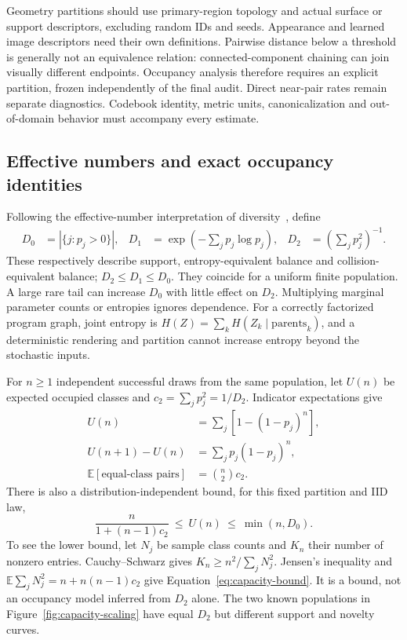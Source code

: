 \documentclass{article}
\begin{document}
Geometry partitions should use primary-region topology and actual surface or
support descriptors, excluding random IDs and seeds. Appearance and learned
image descriptors need their own definitions. Pairwise distance below a threshold
is generally not an equivalence relation: connected-component chaining can join
visually different endpoints. Occupancy analysis therefore requires an explicit
partition, frozen independently of the final audit. Direct near-pair rates remain
separate diagnostics. Codebook identity, metric units, canonicalization and
out-of-domain behavior must accompany every estimate.

\subsection{Effective numbers and exact occupancy identities}
Following the effective-number interpretation of diversity~\cite{hill1973}, define
\begin{align}
 D_0 &= |\{j:p_j>0\}|, &
 D_1 &= \exp\!\left(-\sum_jp_j\log p_j\right), &
 D_2 &= \left(\sum_jp_j^2\right)^{-1}.
 \label{eq:capacity-hill}
\end{align}
These respectively describe support, entropy-equivalent balance and
collision-equivalent balance; $D_2\leq D_1\leq D_0$. They coincide for a uniform
finite population. A large rare tail can increase $D_0$ with little effect on
$D_2$. Multiplying marginal parameter counts or entropies ignores dependence.
For a correctly factorized program graph, joint entropy is
$H(Z)=\sum_k H(Z_k\mid\mathrm{parents}_k)$, and a deterministic rendering and
partition cannot increase entropy beyond the stochastic inputs.

For $n\geq1$ independent successful draws from the same population, let $U(n)$ be
expected occupied classes and $c_2=\sum_jp_j^2=1/D_2$. Indicator expectations give
\begin{align}
 U(n) &= \sum_j\left[1-(1-p_j)^n\right], \label{eq:capacity-occupancy}\\
 U(n+1)-U(n) &= \sum_j p_j(1-p_j)^n, \label{eq:capacity-novelty}\\
 \mathbb E[\text{equal-class pairs}] &= {n\choose2}c_2. \label{eq:capacity-pairs}
\end{align}
There is also a distribution-independent bound, for this fixed partition and IID law,
\begin{equation}
 \frac{n}{1+(n-1)c_2}\ \leq\ U(n)\ \leq\ \min(n,D_0).
 \label{eq:capacity-bound}
\end{equation}
To see the lower bound, let $N_j$ be sample class counts and $K_n$ their number of
nonzero entries. Cauchy--Schwarz gives $K_n\geq n^2/\sum_jN_j^2$. Jensen's
inequality and $\mathbb E\sum_jN_j^2=n+n(n-1)c_2$ give
Equation~\ref{eq:capacity-bound}. It is a bound, not an occupancy model inferred
from $D_2$ alone. The two known populations in Figure~\ref{fig:capacity-scaling}
have equal $D_2$ but different support and novelty curves.
\end{document}
